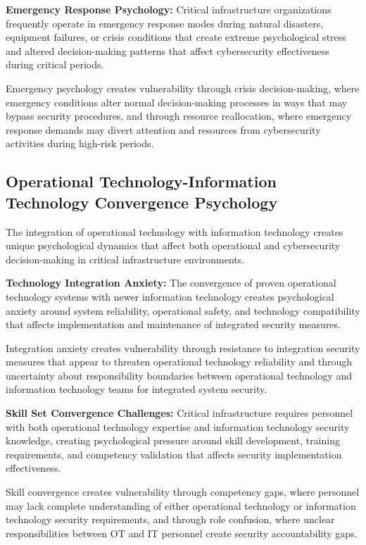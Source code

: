 \documentclass[10pt, twocolumn]{article}
\begin{document}
\textbf{Emergency Response Psychology:} Critical infrastructure organizations frequently operate in emergency response modes during natural disasters, equipment failures, or crisis conditions that create extreme psychological stress and altered decision-making patterns that affect cybersecurity effectiveness during critical periods.

Emergency psychology creates vulnerability through crisis decision-making, where emergency conditions alter normal decision-making processes in ways that may bypass security procedures, and through resource reallocation, where emergency response demands may divert attention and resources from cybersecurity activities during high-risk periods.

\subsection{Operational Technology-Information Technology Convergence Psychology}

The integration of operational technology with information technology creates unique psychological dynamics that affect both operational and cybersecurity decision-making in critical infrastructure environments.

\textbf{Technology Integration Anxiety:} The convergence of proven operational technology systems with newer information technology creates psychological anxiety around system reliability, operational safety, and technology compatibility that affects implementation and maintenance of integrated security measures.

Integration anxiety creates vulnerability through resistance to integration security measures that appear to threaten operational technology reliability and through uncertainty about responsibility boundaries between operational technology and information technology teams for integrated system security.

\textbf{Skill Set Convergence Challenges:} Critical infrastructure requires personnel with both operational technology expertise and information technology security knowledge, creating psychological pressure around skill development, training requirements, and competency validation that affects security implementation effectiveness.

Skill convergence creates vulnerability through competency gaps, where personnel may lack complete understanding of either operational technology or information technology security requirements, and through role confusion, where unclear responsibilities between OT and IT personnel create security accountability gaps.
\end{document}
